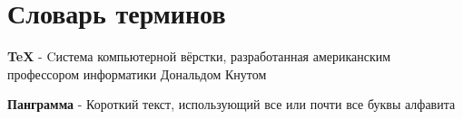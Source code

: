 \chapter*{Словарь терминов}             %

\textbf{TeX} - Cистема компьютерной вёрстки, разработанная американским профессором информатики Дональдом Кнутом

\textbf{Панграмма} - Короткий текст, использующий все или почти все буквы алфавита

